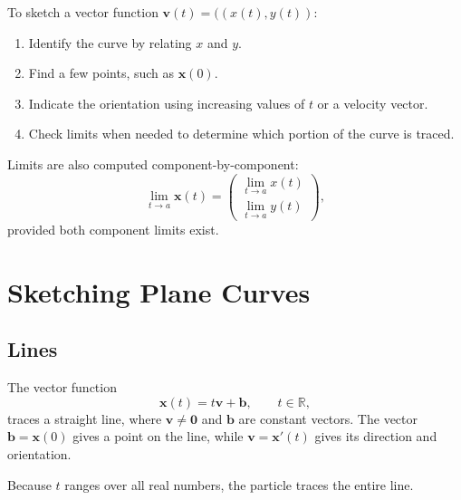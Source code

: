 \documentclass[11pt,letterpaper]{article}
\begin{document}
To sketch a vector function $\textbf{v}(t)=((x(t),y(t))$:
\begin{enumerate}
    \item Identify the curve by relating $x$ and $y$.
    \item Find a few points, such as $\mathbf{x}(0)$.
    \item Indicate the orientation using increasing
    values of $t$ or a velocity vector.
    \item Check limits when needed to determine which
    portion of the curve is traced.
\end{enumerate}

Limits are also computed component-by-component:
\[
\lim_{t\to a}\mathbf{x}(t)=
\begin{pmatrix}
\displaystyle\lim_{t\to a}x(t)\\[2mm]
\displaystyle\lim_{t\to a}y(t)
\end{pmatrix},
\]
provided both component limits exist.

\section{Sketching Plane Curves}


\subsection{Lines}

The vector function
\[
\mathbf{x}(t)=t\mathbf{v}+\mathbf{b},
\qquad t\in\mathbb R,
\]
traces a straight line, where $\mathbf{v}\ne\mathbf{0}$
and $\mathbf{b}$ are constant vectors.
The vector $\mathbf{b}=\mathbf{x}(0)$ gives a point
on the line, while $\mathbf{v}=\mathbf{x}'(t)$ gives
its direction and orientation.

Because $t$ ranges over all real numbers, the particle
traces the entire line.
\end{document}
